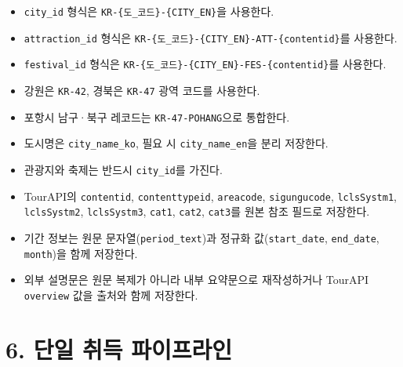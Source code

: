 \documentclass[12pt,a4paper]{article}
\newcommand{\DocNeedspace}[1]{\par\ifdim\dimexpr\pagegoal-\pagetotal\relax<#1\newpage\fi}
\begin{document}
\begin{itemize}
\item \texttt{city\_\allowbreak{}id} 형식은 \texttt{KR-\allowbreak{}\{\allowbreak{}도\_\allowbreak{}코드\allowbreak{}\}-\allowbreak{}\{\allowbreak{}CITY\_\allowbreak{}EN\allowbreak{}\}}을 사용한다.
\item \texttt{attraction\_\allowbreak{}id} 형식은 \texttt{KR-\allowbreak{}\{\allowbreak{}도\_\allowbreak{}코드\allowbreak{}\}-\allowbreak{}\{\allowbreak{}CITY\_\allowbreak{}EN\allowbreak{}\}-\allowbreak{}ATT-\allowbreak{}\{\allowbreak{}content\allowbreak{}id\allowbreak{}\}}를 사용한다.
\item \texttt{festival\_\allowbreak{}id} 형식은 \texttt{KR-\allowbreak{}\{\allowbreak{}도\_\allowbreak{}코드\allowbreak{}\}-\allowbreak{}\{\allowbreak{}CITY\_\allowbreak{}EN\allowbreak{}\}-\allowbreak{}FES-\allowbreak{}\{\allowbreak{}content\allowbreak{}id\allowbreak{}\}}를 사용한다.
\item 강원은 \texttt{KR-\allowbreak{}42}, 경북은 \texttt{KR-\allowbreak{}47} 광역 코드를 사용한다.
\item 포항시 남구·북구 레코드는 \texttt{KR-\allowbreak{}47-\allowbreak{}POHANG}으로 통합한다.
\item 도시명은 \texttt{city\_\allowbreak{}name\_\allowbreak{}ko}, 필요 시 \texttt{city\_\allowbreak{}name\_\allowbreak{}en}을 분리 저장한다.
\item 관광지와 축제는 반드시 \texttt{city\_\allowbreak{}id}를 가진다.
\item TourAPI의 \texttt{content\allowbreak{}id}, \texttt{content\allowbreak{}type\allowbreak{}id}, \texttt{areacode}, \texttt{sigungu\allowbreak{}code}, \texttt{lcls\allowbreak{}Systm1}, \texttt{lcls\allowbreak{}Systm2}, \texttt{lcls\allowbreak{}Systm3}, \texttt{cat1}, \texttt{cat2}, \texttt{cat3}를 원본 참조 필드로 저장한다.
\item 기간 정보는 원문 문자열(\texttt{period\_\allowbreak{}text})과 정규화 값(\texttt{start\_\allowbreak{}date}, \texttt{end\_\allowbreak{}date}, \texttt{month})을 함께 저장한다.
\item 외부 설명문은 원문 복제가 아니라 내부 요약문으로 재작성하거나 TourAPI \texttt{overview} 값을 출처와 함께 저장한다.
\end{itemize}


\newpage

\DocNeedspace{10\baselineskip}
\section*{6. 단일 취득 파이프라인}
\end{document}
